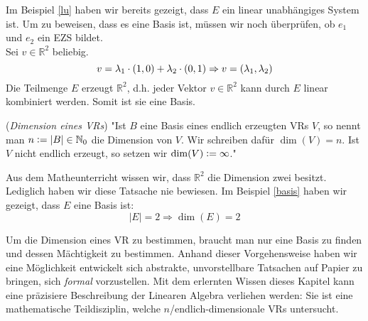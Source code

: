 \begin{example} \label{basis}
Im Beispiel \ref{lu} haben wir bereits gezeigt, dass $E$ ein linear unabhängiges System ist. Um zu beweisen, dass es eine Basis ist, müssen wir noch überprüfen, ob $e_1$ und $e_2$ ein \acl{EZS} bildet.
\\ Sei $v\in \mathbb{R}^2$ beliebig. 
\[v=\lambda_1\cdot(1,0)+\lambda_2\cdot (0,1)\\
\Rightarrow v=(\lambda_1,\lambda_2)\]
Die Teilmenge $E$ erzeugt $\mathbb{R}^2$, d.h. jeder Vektor $v \in \mathbb{R}^2$ kann durch $E$ linear kombiniert werden. Somit ist sie eine Basis.
\end{example}

\theoremstyle{definition}
\begin{definition}\cite[S. 504]{Enzy} (\emph{Dimension eines \acl{VR}s}) \label{def:dim}"Ist $B$ eine Basis eines endlich erzeugten \acl{VR}s $V$, so nennt man $n \vcentcolon= |B| \in \mathbb{N}_0$ die Dimension von $V$. Wir schreiben dafür $\dim(V)= n$. Ist $V$ nicht endlich erzeugt, so setzen wir $\dim(V)\vcentcolon= \infty$." 
\end{definition}

\begin{example}
Aus dem Matheunterricht wissen wir, dass $\mathbb{R}^2$ die Dimension zwei besitzt. Lediglich haben wir diese Tatsache nie bewiesen. Im Beispiel \ref{basis} haben wir gezeigt, dass $E$ eine Basis ist:
\[|E|=2\Rightarrow\dim(E)=2\]
\end{example}

Um die Dimension eines \acl{VR} zu bestimmen, braucht man nur eine Basis zu finden und dessen Mächtigkeit zu bestimmen. Anhand dieser Vorgehensweise haben wir eine Möglichkeit entwickelt sich abstrakte, unvorstellbare Tatsachen auf Papier zu bringen, sich \emph{formal} vorzustellen. Mit dem erlernten Wissen dieses Kapitel kann eine präzisiere Beschreibung der Linearen Algebra verliehen werden: Sie ist eine mathematische Teildisziplin, welche $n$/endlich-dimensionale \aclp{VR} untersucht. 
